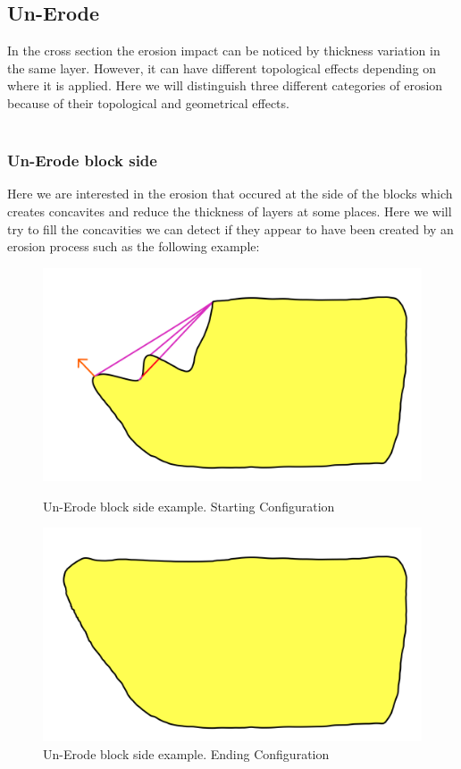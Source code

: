 \documentclass[12pt, a4paper]{report} %
\begin{document}
\subsection{Un-Erode}
\label{sub:unerode}

In the cross section the erosion impact can be noticed by thickness variation in the same layer. However, it can have different topological effects depending on where it is applied. Here we will distinguish three different categories of erosion because of their topological and geometrical effects.\\\\

\subsubsection{Un-Erode block side}
Here we are interested in the erosion that occured at the side of the blocks which creates concavites and reduce the thickness of layers at some places. Here we will try to fill the concavities we can detect if they appear to have been created by an erosion process such as the following example:
\begin{figure}[h]
    \begin{minipage}[c]{.46\linewidth}
        \centering
        \includegraphics[scale=0.2]{unErodeSideDescription0.png}
	\caption{Un-Erode block side example. Starting Configuration}
    \end{minipage}
    \hfill%
    \begin{minipage}[c]{.46\linewidth}
        \centering
        \includegraphics[scale=0.2]{unErodeSideDescription1.png}
	\caption{Un-Erode block side example. Ending Configuration}
    \end{minipage}
\end{figure}\\
\end{document}
